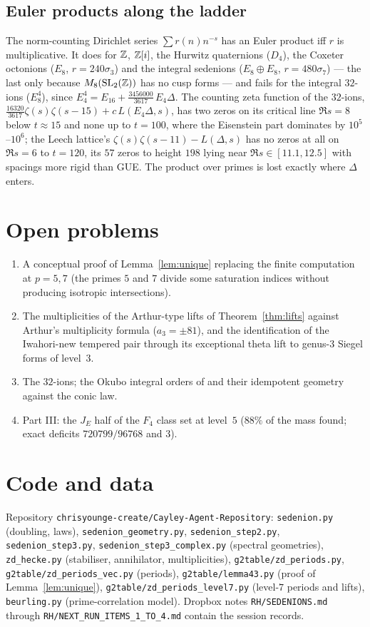 \documentclass[11pt]{amsart}
\theoremstyle{definition}
\begin{document}
\subsection{Euler products along the ladder}
The norm-counting Dirichlet series $\sum r(n)n^{-s}$ has an Euler product iff $r$ is multiplicative. It does for $\mathbb{Z}$, $\mathbb{Z}[i]$, the Hurwitz quaternions ($D_4$), the Coxeter octonions ($E_8$, $r=240\sigma_3$) and the integral sedenions ($E_8\oplus E_8$, $r=480\sigma_7$) --- the last only because $M_8(\mathrm{SL}_2(\mathbb{Z}))$ has no cusp forms --- and fails for the integral $32$-ions ($E_8^4$), since $E_4^4=E_{16}+\tfrac{3456000}{3617}\,E_4\Delta$. The counting zeta function of the $32$-ions, $\tfrac{16320}{3617}\zeta(s)\zeta(s-15)+c\,L(E_4\Delta,s)$, has two zeros on its critical line $\Re s=8$ below $t\approx 15$ and none up to $t=100$, where the Eisenstein part dominates by $10^5$--$10^6$; the Leech lattice's $\zeta(s)\zeta(s-11)-L(\Delta,s)$ has no zeros at all on $\Re s=6$ to $t=120$, its $57$ zeros to height $198$ lying near $\Re s\in[11.1,12.5]$ with spacings more rigid than GUE. The product over primes is lost exactly where $\Delta$ enters.

\section{Open problems}
\begin{enumerate}[leftmargin=2em]
\item A conceptual proof of Lemma~\ref{lem:unique} replacing the finite computation at $p=5,7$ (the primes $5$ and $7$ divide some saturation indices without producing isotropic intersections).
\item The multiplicities of the Arthur-type lifts of Theorem~\ref{thm:lifts} against Arthur's multiplicity formula ($a_3=\pm 81$), and the identification of the Iwahori-new tempered pair through its exceptional theta lift to genus-$3$ Siegel forms of level~$3$.
\item The $32$-ions; the Okubo integral orders of \cite{Corr26} and their idempotent geometry against the conic law.
\item Part III: the $J_E$ half of the $F_4$ class set at level~$5$ ($88\%$ of the mass found; exact deficits $720799/96768$ and $3$).
\end{enumerate}

\appendix
\section{Code and data}
Repository \texttt{chrisyounge-create/Cayley-Agent-Repository}: \texttt{sedenion.py} (doubling, laws), \texttt{sedenion\_geometry.py}, \texttt{sedenion\_step2.py}, \texttt{sedenion\_step3.py}, \texttt{sedenion\_step3\_complex.py} (spectral geometries), \texttt{zd\_hecke.py} (stabiliser, annihilator, multiplicities), \texttt{g2table/zd\_periods.py}, \texttt{g2table/zd\_periods\_vec.py} (periods), \texttt{g2table/lemma43.py} (proof of Lemma~\ref{lem:unique}), \texttt{g2table/zd\_periods\_level7.py} (level-$7$ periods and lifts), \texttt{beurling.py} (prime-correlation model). Dropbox notes \texttt{RH/SEDENIONS.md} through \texttt{RH/NEXT\_RUN\_ITEMS\_1\_TO\_4.md} contain the session records.
\end{document}
